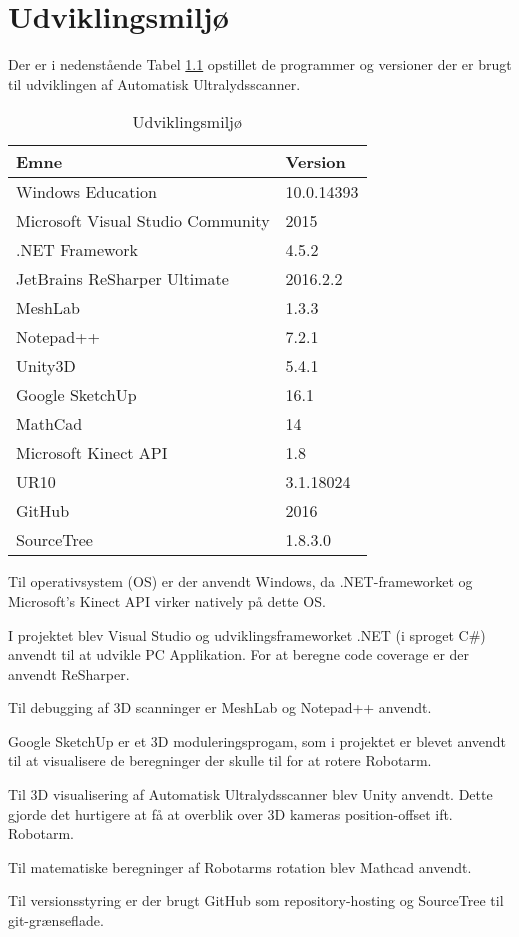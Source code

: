 \chapter{Udviklingsmiljø}\label{Udvikling}
Der er i nedenstående Tabel \ref{Udvikling} opstillet de programmer og versioner der er brugt til udviklingen af Automatisk Ultralydsscanner. 

\begin{table}[htb]
\centering
\begin{tabular}{| l | p{}| }
\hline
\textbf{Emne} & \textbf{Version} \\\hline
Windows Education & 10.0.14393 \\\hline
Microsoft Visual Studio Community & 2015 \\\hline
.NET Framework & 4.5.2 \\\hline
JetBrains ReSharper Ultimate & 2016.2.2\\\hline
MeshLab & 1.3.3 \\\hline
Notepad++ & 7.2.1 \\\hline
Unity3D & 5.4.1 \\\hline
Google SketchUp & 16.1 \\\hline
MathCad & 14 \\\hline
Microsoft Kinect API & 1.8 \\\hline
UR10 & 3.1.18024 \\\hline
GitHub & 2016\\\hline
SourceTree & 1.8.3.0 \\\hline

\end{tabular}
\caption{Udviklingsmiljø}
\label{Udvikling}
\end{table}

Til operativsystem (OS) er der anvendt Windows, da .NET-frameworket og Microsoft's Kinect API virker natively på dette OS.

I projektet blev Visual Studio og udviklingsframeworket .NET (i sproget C\#) anvendt til at udvikle PC Applikation. For at beregne code coverage er der anvendt ReSharper.

Til debugging af 3D scanninger er MeshLab og Notepad++ anvendt. 

Google SketchUp er et 3D moduleringsprogam, som i projektet er blevet anvendt til at visualisere de beregninger der skulle til for at rotere Robotarm.

Til 3D visualisering af Automatisk Ultralydsscanner blev Unity anvendt. Dette gjorde det hurtigere at få at overblik over 3D kameras position-offset ift. Robotarm.

Til matematiske beregninger af Robotarms rotation blev Mathcad anvendt.

Til versionsstyring er der brugt GitHub som repository-hosting og SourceTree til git-grænseflade.


